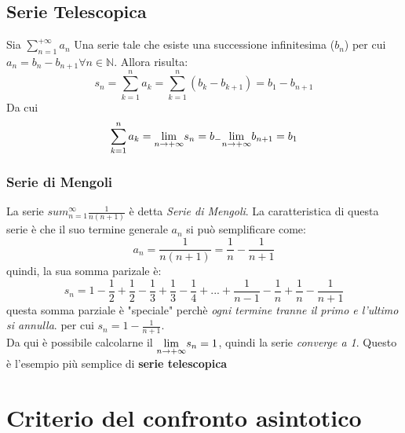 \documentclass[12pt, a4paper, openany]{book}
\begin{document}
\subsection{Serie Telescopica}
Sia $\sum_{n=1}^{+\infty} a_n$ Una serie tale che esiste una successione infinitesima ($b_n$) per cui $a_n = b_n - b_{n+1} \forall n\in \mathbb{N}$.
Allora risulta:
\begin{equation*}
    s_n = \sum_{k=1}^{n}a_k = \sum_{k=1}^n (b_k - b_{k+1}) = b_1 - b_{n+1}
\end{equation*}
Da cui
\begin{equation*}
    \sum_{k=1}^{n}a_k = \underset{n \to +\infty}{\lim} s_n = b_ - \underset{n \to +\infty}{\lim} b_{n+1} = b_1
\end{equation*}

\subsubsection*{Serie di Mengoli}
La serie $sum_{n=1}^\infty \frac{1}{n(n+1)}$ è detta \emph{Serie di Mengoli}.
La caratteristica di questa serie è che il suo termine generale $a_n$ si può semplificare come:
\begin{equation*}
    a_n = \frac{1}{n(n+1)} = \frac{1}{n} - \frac{1}{n+1}
\end{equation*}
quindi, la sua somma parizale è:
\begin{equation*}
    s_n = 1 - \frac{1}{2} + \frac{1}{2} - \frac{1}{3} +  \frac{1}{3} - \frac{1}{4} + ... +  \frac{1}{n-1} - \frac{1}{n} +  \frac{1}{n} - \frac{1}{n+1}
\end{equation*}
questa somma parziale è "speciale" perchè \emph{ogni termine tranne il primo e l'ultimo si annulla}. per cui $s_n = 1 - \frac{1}{n+1}$.
\\Da qui è possibile calcolarne il $\underset{n \to +\infty}{\lim} s_n = 1$, quindi la serie \emph{converge a 1}.
Questo è l'esempio più semplice di \textbf{serie telescopica}  

\section{Criterio del confronto asintotico}
\end{document}
